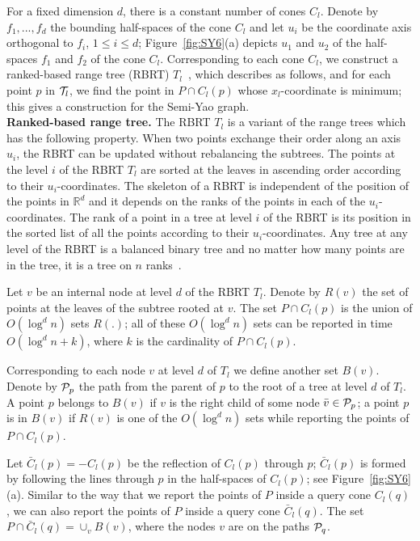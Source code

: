 \documentclass[11pt]{llncs}
\begin{document}
For a fixed dimension $d$, there is a constant number of cones $C_l$. Denote by $f_1,...,f_d$ the bounding half-spaces of the cone $C_l$ and let $u_i$ be the coordinate axis orthogonal to $f_i$, $1\leq i\leq d$; Figure~\ref{fig:SY6}(a) depicts $u_1$ and $u_2$ of the half-spaces $f_1$ and $f_2$ of the cone $C_l$. Corresponding to each cone $C_l$, we construct a ranked-based range tree (RBRT) $T_l$~\cite{Abam:2011:KSX:1971362.1971367}, which describes as follows, and for each point $p$ in ${\cal T}_l$, we find the point in $P\cap C_l(p)$ whose $x_l$-coordinate is minimum; this gives a construction for the Semi-Yao graph. \\
\textbf{Ranked-based range tree.} The RBRT $T_l$ is a variant of the range trees which has the following property. When two points exchange their order along an axis $u_i$, the RBRT can be updated without rebalancing the subtrees. The points at the level $i$ of the RBRT $T_l$ are sorted at the leaves in ascending order according to their $u_i$-coordinates. The skeleton of a RBRT is independent of the position of the points in $\mathbb{R}^d$ and it depends on the ranks of the points in each of the $u_i$-coordinates. The rank of a point in a tree at level $i$ of the RBRT is its position in the sorted list of all the points according to their $u_i$-coordinates. Any tree at any level of the RBRT is a balanced binary tree and no matter how many points are in the tree, it is a tree on $n$ ranks~\cite{Abam:2011:KSX:1971362.1971367}.


Let $v$ be an internal node at level $d$ of the RBRT $T_l$. Denote by $R(v)$ the set of points at the leaves of the subtree rooted at $v$.  The set $P\cap C_l(p)$ is the union of $O(\log^d n)$ sets $R(.)$; all of these $O(\log^d n)$ sets can be reported in time $O(\log^d n+k)$, where $k$ is the cardinality of $P\cap C_l(p)$. 

Corresponding to each node $v$ at level $d$ of $T_l$ we define another set $B(v)$. Denote by ${\cal P}_p$ the path from the parent of $p$ to the root of a tree at level $d$ of $T_l$. A point $p$ belongs to $B(v)$ if $v$ is the right child of some node $\bar{v}\in {\cal P}_p$; a point $p$ is in $B(v)$ if $R(v)$ is one of the $O(\log^d n)$ sets while reporting the points of $P\cap C_l(p)$.

Let $\bar{C}_l(p)=-C_l(p)$ be the reflection of $C_l(p)$ through $p$; $\bar{C}_l(p)$ is formed by following the lines through $p$ in the half-spaces of $C_l(p)$; see Figure~\ref{fig:SY6}(a). Similar to the way that we report the points of $P$ inside a query cone $C_l(q)$, we can also report the points of $P$ inside a query cone $\bar{C}_l(q)$. The set $P\cap \bar{C}_l(q)=\cup_v B(v)$, where the nodes $v$ are on the paths ${\cal P}_q$.
\end{document}
